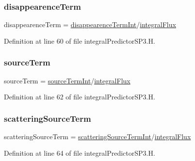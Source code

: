 \subsubsection{\texorpdfstring{disappearence\+Term}{disappearenceTerm}}
{\footnotesize\ttfamily disappearence\+Term = \hyperlink{integralPredictorSP3_8H_af3f24745c62331a2c7c7bd0dead37b6a}{disappearence\+Term\+Int}/\hyperlink{integralPredictorSP3_8H_a2a0b08b13037e807e2dd9a5db5f493fa}{integral\+Flux}}



Definition at line 60 of file integral\+Predictor\+S\+P3.\+H.

\mbox{\label{integralPredictorSP3_8H_a917a012199c77c70638448d199750771}} 
\subsubsection{\texorpdfstring{source\+Term}{sourceTerm}}
{\footnotesize\ttfamily source\+Term = \hyperlink{integralPredictorSP3_8H_ac69cf9b0ca49bbc73bbd8757cc3ebae3}{source\+Term\+Int}/\hyperlink{integralPredictorSP3_8H_a2a0b08b13037e807e2dd9a5db5f493fa}{integral\+Flux}}



Definition at line 62 of file integral\+Predictor\+S\+P3.\+H.

\mbox{\label{integralPredictorSP3_8H_a9aa913bf9329cc3ad657343f9e96ceeb}} 
\subsubsection{\texorpdfstring{scattering\+Source\+Term}{scatteringSourceTerm}}
{\footnotesize\ttfamily scattering\+Source\+Term = \hyperlink{integralPredictorSP3_8H_a6c06ef7a771d3996b52235080e43589b}{scattering\+Source\+Term\+Int}/\hyperlink{integralPredictorSP3_8H_a2a0b08b13037e807e2dd9a5db5f493fa}{integral\+Flux}}



Definition at line 64 of file integral\+Predictor\+S\+P3.\+H.

